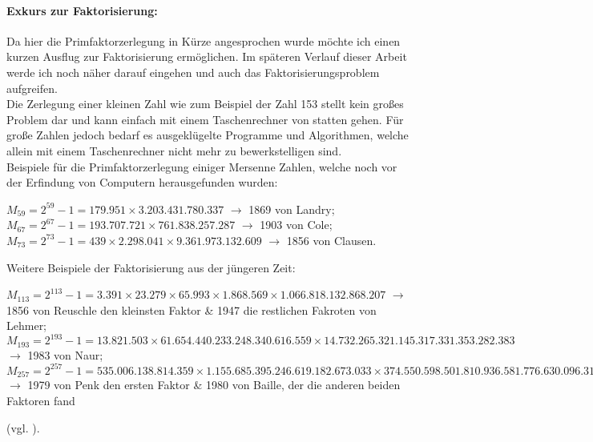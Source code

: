 \documentclass[german,12pt,a4paper]{article}
\begin{document}
\paragraph{Exkurs zur Faktorisierung:}Da hier die Primfaktorzerlegung in Kürze angesprochen wurde möchte ich einen kurzen Ausflug zur Faktorisierung ermöglichen. Im späteren Verlauf dieser Arbeit werde ich noch näher darauf eingehen und auch das Faktorisierungsproblem aufgreifen.\\
Die Zerlegung einer kleinen Zahl wie zum Beispiel der Zahl 153 stellt kein großes Problem dar und kann einfach mit einem Taschenrechner von statten gehen. Für große Zahlen jedoch bedarf es ausgeklügelte Programme und Algorithmen, welche allein mit einem Taschenrechner nicht mehr zu bewerkstelligen sind.\\
Beispiele für die Primfaktorzerlegung einiger Mersenne Zahlen, welche noch vor der Erfindung von Computern herausgefunden wurden:\
\begin{center}
$M_{59} = 2^{59}-1 = 179.951\times3.203.431.780.337$ $\rightarrow$ 1869 von Landry;\\
$M_{67} = 2^{67}-1 = 193.707.721\times761.838.257.287$ $\rightarrow$ 1903 von Cole;\\
$M_{73} = 2^{73}-1 = 439\times2.298.041\times9.361.973.132.609$ $\rightarrow$ 1856 von Clausen.\\
\end{center}
Weitere Beispiele der Faktorisierung aus der jüngeren Zeit:\
\begin{center}
$M_{113} = 2^{113}-1 = 3.391\times23.279\times65.993\times1.868.569\times1.066.818.132.868.207$ $\rightarrow$ 1856 von Reuschle den kleinsten Faktor \& 1947 die restlichen Fakroten von Lehmer;\\
$M_{193} = 2^{193}-1 = 13.821.503\times61.654.440.233.248.340.616.559\times14.732.265.321.145.317.331.353.282.383$ $\rightarrow$ 1983 von Naur;\\
$M_{257} = 2^{257}-1 = 535.006.138.814.359\times1.155.685.395.246.619.182.673.033\times374.550.598.501.810.936.581.776.630.096.313.181.393$ $\rightarrow$ 1979 von Penk den ersten Faktor \& 1980 von Baille, der die anderen beiden Faktoren fand\end{center} (vgl. \cite[125--128]{Ribenboim2006}).
\end{document}
